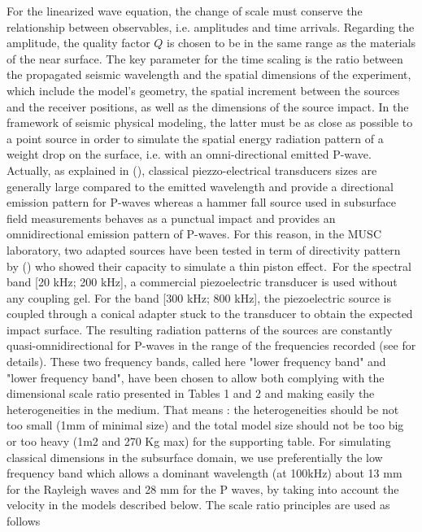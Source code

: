 \documentclass[extra,mreferee]{gji}
\begin{document}
For the linearized wave equation, the change of scale must conserve the relationship between observables, i.e. amplitudes and time arrivals. Regarding the amplitude, the quality factor $Q$ is chosen to be in the same range as the materials of the near surface. The key parameter for the time scaling is the ratio between the propagated seismic wavelength and the spatial dimensions of the experiment, which include the model’s geometry, the spatial increment between the sources and the receiver positions, as well as the dimensions of the source impact. In the framework of seismic physical modeling, the latter must be as close as possible to a point source in order to simulate the spatial energy radiation pattern of a weight drop on the surface, i.e. with an omni-directional emitted P-wave.{\color{magenta} Actually, as explained in (\cite{bretaudeau2011ssm}), classical piezzo-electrical transducers sizes are generally large compared to the emitted wavelength and provide a directional emission pattern for P-waves whereas a hammer fall source used in subsurface field measurements behaves as a punctual impact and provides an omnidirectional emission pattern of P-waves. For this reason, in the MUSC laboratory, two adapted sources have been tested in term of directivity pattern by (\cite{bretaudeau2011ssm})  who showed their capacity to simulate a thin piston effect.} For the spectral band [20 kHz; 200 kHz], a commercial piezoelectric transducer is used without any coupling gel. For the band [300 kHz; 800 kHz], the piezoelectric source is coupled through a conical adapter stuck to the transducer to obtain the expected impact surface. The resulting radiation patterns of the sources are constantly quasi-omnidirectional for P-waves in the range of the frequencies recorded (see \cite{bretaudeau2011ssm} for details). 
{\color{magenta}These two frequency bands, called here "lower frequency band" and  "lower frequency band", have been chosen to allow both complying with the dimensional scale ratio presented in Tables 1 and 2 and making easily the heterogeneities in the medium. That means : the heterogeneities should be not too small (1mm of minimal size) and the total model size should not be too big or too heavy (1m2 and 270 Kg max) for the supporting table. For simulating classical dimensions in the subsurface domain, we use preferentially the low frequency band which allows a dominant wavelength (at 100kHz) about 13 mm for the Rayleigh waves and 28 mm for the P waves, by taking into account the velocity in the models described below. The scale ratio principles are used as follows}
\end{document}
